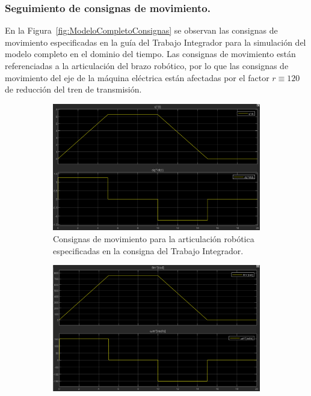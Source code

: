 \documentclass{article}
\begin{document}
\subsubsection{Seguimiento de consignas de movimiento.}

En la Figura~\ref{fig:ModeloCompletoConsignas} se observan las consignas de movimiento especificadas en la guía del Trabajo Integrador para la simulación del modelo completo en el dominio del tiempo. Las consignas de movimiento están referenciadas a la articulación del brazo robótico, por lo que las consignas de movimiento del eje de la máquina eléctrica están afectadas por el factor \(r \equiv 120\) de reducción del tren de transmisión. 

\begin{figure}[H]
    \centering
    \begin{subfigure}[b]{0.48\textwidth}
        \centering
        \includegraphics[width=\textwidth]{Imagenes/ConsignasMovimientoArticulacionRobotica.png}
        \caption{Consignas de movimiento para la articulación robótica especificadas en la consigna del Trabajo Integrador.}
        \label{fig:ConsignasMovimientoArticulaconRobotica}
    \end{subfigure}
    \hfill
    \begin{subfigure}[b]{0.48\textwidth}
        \centering
        \includegraphics[width=\textwidth]{Imagenes/ConsignasMovimientoMaquinaElectrica.png}

\end{subfigure}
\end{figure}
\end{document}
